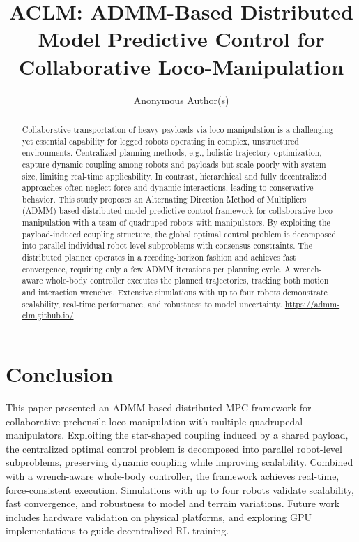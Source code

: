 \documentclass[letterpaper, 10 pt, conference]{ieeeconf}  %
\title{\LARGE \bf
ACLM: ADMM-Based Distributed Model Predictive Control for Collaborative Loco-Manipulation
}
\author{\large Anonymous Author(s)}
\theoremstyle{remarkcolon}
\begin{document}
\maketitle
\thispagestyle{empty}
\pagestyle{empty}


\begin{abstract}
Collaborative transportation of heavy payloads via loco-manipulation is a challenging yet essential capability for legged robots operating in complex, unstructured environments. Centralized planning methods, e.g., holistic trajectory optimization, capture dynamic coupling among robots and payloads but scale poorly with system size, limiting real-time applicability. In contrast, hierarchical and fully decentralized approaches often neglect force and dynamic interactions, leading to conservative behavior. This study proposes an Alternating Direction Method of Multipliers (ADMM)-based distributed model predictive control framework for collaborative loco-manipulation with a team of quadruped robots with manipulators. By exploiting the payload-induced coupling structure, the global optimal control problem is decomposed into parallel individual-robot-level subproblems with consensus constraints. The distributed planner operates in a receding-horizon fashion and achieves fast convergence, requiring only a few ADMM iterations per planning cycle. A wrench-aware whole-body controller executes the planned trajectories, tracking both motion and interaction wrenches. Extensive simulations with up to four robots demonstrate scalability, real-time performance, and robustness to model uncertainty. \url{https://admm-clm.github.io/}

\end{abstract}











\section{Conclusion}
\label{sec:conclusion}
This paper presented an ADMM-based distributed MPC framework for collaborative prehensile loco-manipulation with multiple quadrupedal manipulators. Exploiting the star-shaped coupling induced by a shared payload, the centralized optimal control problem is decomposed into parallel robot-level subproblems, preserving dynamic coupling while improving scalability. Combined with a wrench-aware whole-body controller, the framework achieves real-time, force-consistent execution. Simulations with up to four robots validate scalability, fast convergence, and robustness to model and terrain variations. Future work includes hardware validation on physical platforms, and exploring GPU implementations to guide decentralized RL training.




\end{document}
